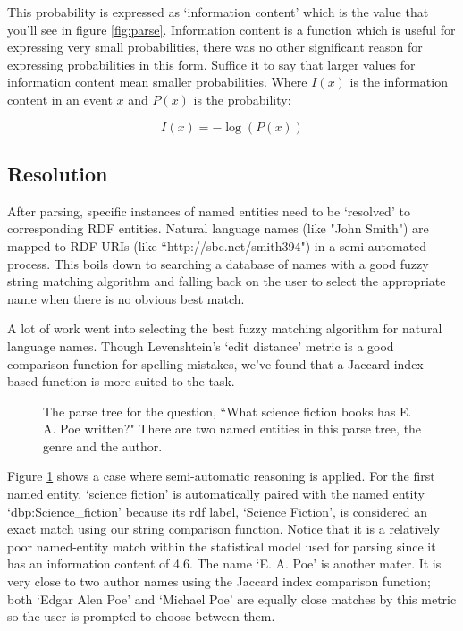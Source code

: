 \documentclass[11pt]{article}
\begin{document}
This probability is expressed as `information content'\cite{shannon} which is
the value that you'll see in figure \ref{fig:parse}. 
Information content is a function which is useful for expressing very small 
probabilities, there was no other significant reason for expressing
probabilities in this form. Suffice it to say that larger values for information content
mean smaller probabilities. Where $I(x)$ is the information content in an event
$x$ and $P(x)$ is the probability:

\[ I(x) = -\log(P(x)) \]

\subsection{Resolution}
\label{resolution}
After parsing, specific instances of named entities need to be `resolved' to
corresponding RDF entities. Natural language names (like "John Smith") are mapped
to RDF URIs (like ``http://sbc.net/smith394")
in a semi-automated process. This boils down to searching a
database of names with a good fuzzy string matching algorithm and falling
back on the user to select the appropriate name when there is no obvious best 
match.

A lot of work went into selecting the best fuzzy matching algorithm for
natural language names. Though Levenshtein's `edit distance' metric
is a good comparison function for spelling mistakes, we've found that
a Jaccard index based function is more suited to the task. 

\begin{figure}[h!]
\caption{The parse tree for the question, 
``What science fiction books has E. A. Poe written?"
There are two named entities in this parse tree, the genre and the author.}
\label{fig:resolve}
\end{figure}

Figure \ref{fig:resolve} shows a case where semi-automatic reasoning is applied.
For the first named entity, `science fiction' is automatically paired with the
named entity `dbp:Science\_fiction' because its rdf label, `Science Fiction', is 
considered an exact match using our string comparison function. 
Notice that it is a relatively poor named-entity match within the statistical model
used for parsing since it has an information content of 4.6. 
The name `E. A. Poe' is another mater. It is
very close to two author names using the Jaccard index comparison function; both
`Edgar Alen Poe' and `Michael Poe' are equally close matches by this metric so the
user is prompted to choose between them.
\end{document}

